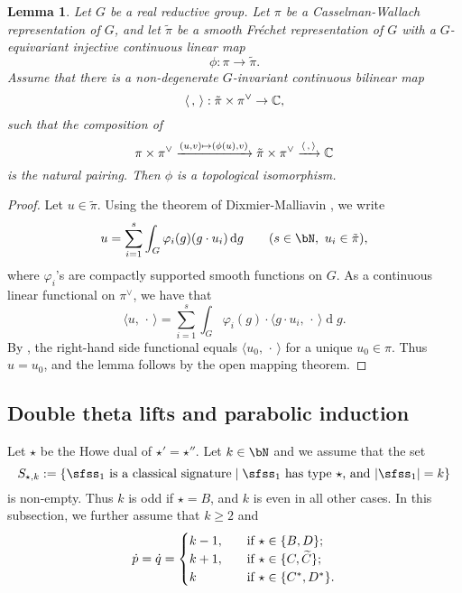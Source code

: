 \documentclass[12pt,a4paper]{amsart}
\def\abs#1{\left|{#1}\right|}
\newcommand{\od}{\operatorname{d}}
\newcommand{\la}{\langle}
\newcommand{\ra}{\rangle}
\newcommand{\be}{\begin {equation}}
\newcommand{\ee}{\end {equation}}
\numberwithin{equation}{section}
\newtheorem{lem}[thm]{Lemma}
\theoremstyle{remark}
\begin{document}
\begin{lem}\label{imb2}
Let $G$ be a real reductive group. Let $\pi$ be a Casselman-Wallach representation of $G$, and let $\tilde \pi$ be a smooth Fr\'echet representation of $G$ with a $G$-equivariant injective continuous linear map
\[
  \phi: \pi\rightarrow \tilde \pi.
\]
Assume that  there is a non-degenerate $G$-invariant continuous bilinear map
\[
\la\,,\,\ra: \tilde \pi\times \pi^\vee\rightarrow \C,
\]
such that the composition of
\[
 \pi\times \pi^\vee\xrightarrow{(u,v)\mapsto (\phi(u),v)} \tilde \pi\times \pi^\vee\xrightarrow{\la\,,\,\ra} \C
\]
is the natural pairing. Then $\phi$ is a topological isomorphism.
\end{lem}
\begin{proof}
 Let $u\in \tilde \pi$.
 Using the theorem of Dixmier-Malliavin \cite[Theorem 3.3]{DM}, we write
 \[
   u=\sum_{i=1}^{s} \int_G \varphi_i(g) ( g\cdot u_i)\od\! g \qquad (s\in \bN, \ u_i\in\tilde \pi),
 \]
 where $\varphi_i$'s are compactly supported smooth functions on $G$.  As a continuous linear functional on $\pi^\vee$, we have that
  \[
   \la u,\, \cdot\, \ra=\sum_{i=1}^{s} \int_G \varphi_i(g)  \cdot \la g\cdot u_i, \,\cdot\,\ra \od\! g.
 \]
By \cite[Lemma 3.5]{SZ1},  the right-hand side  functional  equals  $\la u_0, \,\cdot\,\ra$ for a unique $u_0\in \pi$. Thus $u=u_0$, and the lemma follows by the open mapping theorem.
\end{proof}



\subsection{Double theta lifts and parabolic induction}\label{doublep}
Let $\star$ be the Howe dual of $\star'=\star''$. Let $k\in \bN$ and we assume that the set
\[
 S_{\star, k}:=\{ \textrm{$\sfss_1$ is a classical signature}\mid \textrm{$\sfss_1$ has type $\star$, and $\abs{\sfss_1}=k$}\}
\]
is non-empty. Thus $k$ is odd if $\star=B$, and $k$ is even in all other cases.
In this subsection, we further assume that $k\geq 2$ and
\be\label{dotp}
 \dot p=\dot q= \begin{cases}
 k-1,\quad   &\textrm{if } \star\in \{B,D\};\\
k+1,  & \textrm{if $\star\in \{C, \widetilde C\}$;}\\
k & \textrm{if $ \star\in\{C^*,D^*\}$.}
\end{cases}
 \ee
\end{document}
